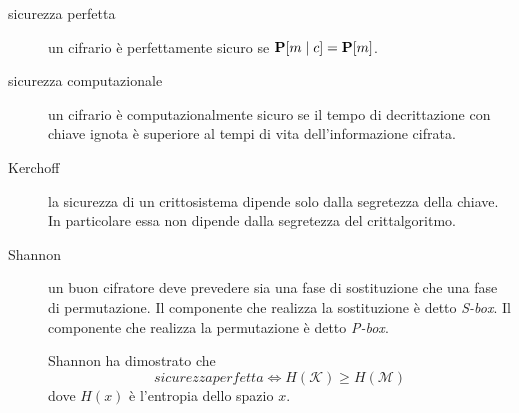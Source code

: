 \begin{description}
	\item[sicurezza perfetta] un cifrario è perfettamente sicuro se $\mathbf{P}[m \mid c]=\mathbf{P}[m]$.
	\item[sicurezza computazionale] un cifrario è computazionalmente sicuro se il tempo di decrittazione con chiave ignota è superiore al tempi di vita dell'informazione cifrata.
\end{description}

\begin{description}
  \item[Kerchoff] la sicurezza di un crittosistema dipende solo dalla segretezza della chiave. In particolare essa non dipende dalla segretezza del crittalgoritmo.

  \item[Shannon] un buon cifratore deve prevedere sia una fase di sostituzione che una fase di permutazione. Il componente che realizza la sostituzione è detto \textit{S-box}. Il componente che realizza la permutazione è detto \textit{P-box}.

  Shannon ha dimostrato che
  \begin{equation}
    sicurezzaperfetta \Leftrightarrow H(\mathcal{K}) \geq H(\mathcal{M})
  \end{equation}
  dove $H(x)$ è l'entropia dello spazio $x$.
\end{description}
